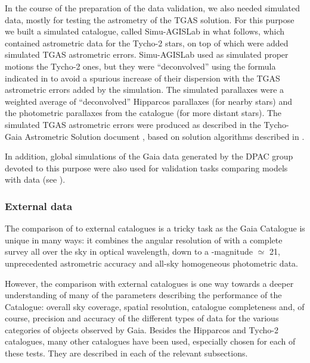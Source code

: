 In the course of the preparation of the data validation, we also needed 
simulated data, mostly for testing the astrometry of the
TGAS solution. For this purpose we built a simulated catalogue,
called Simu-AGISLab in what follows, which contained astrometric data
for the Tycho-2 stars, on top of which were added simulated TGAS astrometric errors.
Simu-AGISLab used as simulated proper motions the Tycho-2 ones, but they were
``deconvolved'' using the formula indicated in \citet[Eq.~10]{1999ASPC..167...13A}
to avoid a spurious increase of their dispersion with the TGAS astrometric errors added
by the simulation. The simulated parallaxes were a weighted average of
``deconvolved'' Hipparcos parallaxes (for nearby stars) and the photometric parallaxes 
from the \cite{2011yCat.6135....0P} catalogue (for more distant stars). 
The simulated TGAS astrometric errors were produced as described in the 
Tycho-Gaia Astrometric Solution document \citep{2015A&A...574A.115M}, based
on solution algorithms described in \citet[][Sect. 7.2]{2012A&A...538A..78L}.

In addition, global simulations of the Gaia data generated by the 
DPAC group devoted to this purpose
were also used for validation tasks comparing models with data (see 
).


\subsubsection{External data}\label{external-data}
The comparison of {} to external catalogues is a tricky task as the Gaia Catalogue is unique in many ways: it combines the angular resolution of  with a complete survey all over the sky in optical wavelength, down to a \gmag-magnitude $\simeq$ 21, unprecedented astrometric accuracy and all-sky homogeneous photometric data. 

However, the comparison with external catalogues is one way towards a deeper understanding of many of the parameters describing the performance of the Catalogue: overall sky coverage, spatial resolution, catalogue completeness and, of course, precision and accuracy of the different types of data for the various categories of objects observed by Gaia. Besides the Hipparcos and Tycho-2 catalogues, many other catalogues have been used, especially chosen for each of these tests. They are described in each of the relevant subsections.

